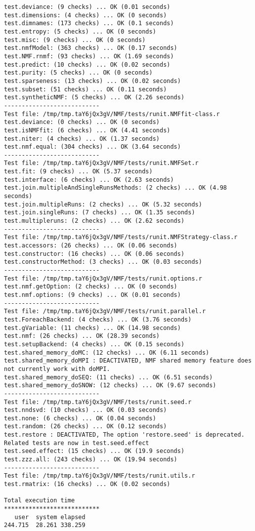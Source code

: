 \documentclass[10pt]{article}
\begin{document}
\begin{verbatim}
test.deviance: (9 checks) ... OK (0.01 seconds)
test.dimensions: (4 checks) ... OK (0 seconds)
test.dimnames: (173 checks) ... OK (0.1 seconds)
test.entropy: (5 checks) ... OK (0 seconds)
test.misc: (9 checks) ... OK (0 seconds)
test.nmfModel: (363 checks) ... OK (0.17 seconds)
test.NMF.rnmf: (93 checks) ... OK (1.69 seconds)
test.predict: (10 checks) ... OK (0.02 seconds)
test.purity: (5 checks) ... OK (0 seconds)
test.sparseness: (13 checks) ... OK (0.02 seconds)
test.subset: (51 checks) ... OK (0.11 seconds)
test.syntheticNMF: (5 checks) ... OK (2.26 seconds)
--------------------------- 
Test file: /tmp/tmp.taY6jQx3gV/NMF/tests/runit.NMFfit-class.r 
test.deviance: (0 checks) ... OK (0 seconds)
test.isNMFfit: (6 checks) ... OK (4.41 seconds)
test.niter: (4 checks) ... OK (1.37 seconds)
test.nmf.equal: (304 checks) ... OK (3.64 seconds)
--------------------------- 
Test file: /tmp/tmp.taY6jQx3gV/NMF/tests/runit.NMFSet.r 
test.fit: (9 checks) ... OK (5.37 seconds)
test.interface: (6 checks) ... OK (2.63 seconds)
test.join.multipleAndSingleRunsMethods: (2 checks) ... OK (4.98 seconds)
test.join.multipleRuns: (2 checks) ... OK (5.32 seconds)
test.join.singleRuns: (7 checks) ... OK (1.35 seconds)
test.multipleruns: (2 checks) ... OK (2.62 seconds)
--------------------------- 
Test file: /tmp/tmp.taY6jQx3gV/NMF/tests/runit.NMFStrategy-class.r 
test.accessors: (26 checks) ... OK (0.06 seconds)
test.constructor: (16 checks) ... OK (0.06 seconds)
test.constructorMethod: (3 checks) ... OK (0.03 seconds)
--------------------------- 
Test file: /tmp/tmp.taY6jQx3gV/NMF/tests/runit.options.r 
test.nmf.getOption: (2 checks) ... OK (0 seconds)
test.nmf.options: (9 checks) ... OK (0.01 seconds)
--------------------------- 
Test file: /tmp/tmp.taY6jQx3gV/NMF/tests/runit.parallel.r 
test.ForeachBackend: (4 checks) ... OK (3.76 seconds)
test.gVariable: (11 checks) ... OK (14.98 seconds)
test.nmf: (26 checks) ... OK (28.39 seconds)
test.setupBackend: (4 checks) ... OK (0.15 seconds)
test.shared_memory_doMC: (12 checks) ... OK (6.11 seconds)
test.shared_memory_doMPI : DEACTIVATED, NMF shared memory feature does not currently work with doMPI.
test.shared_memory_doSEQ: (11 checks) ... OK (6.51 seconds)
test.shared_memory_doSNOW: (12 checks) ... OK (9.67 seconds)
--------------------------- 
Test file: /tmp/tmp.taY6jQx3gV/NMF/tests/runit.seed.r 
test.nndsvd: (10 checks) ... OK (0.03 seconds)
test.none: (6 checks) ... OK (0.04 seconds)
test.random: (26 checks) ... OK (0.12 seconds)
test.restore : DEACTIVATED, The option 'restore.seed' is deprecated. Related tests are now in test.seed.effect
test.seed.effect: (15 checks) ... OK (19.9 seconds)
test.zzz.all: (243 checks) ... OK (19.94 seconds)
--------------------------- 
Test file: /tmp/tmp.taY6jQx3gV/NMF/tests/runit.utils.r 
test.rmatrix: (16 checks) ... OK (0.02 seconds)

Total execution time
***************************
   user  system elapsed 
244.715  28.261 338.259 

\end{verbatim}
\end{document}
